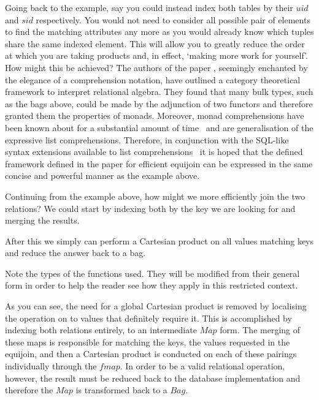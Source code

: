 Going back to the example, say you could instead index both tables by their
$uid$ and $sid$ respectively. You would not need to consider all possible pair
of elements to find the matching attributes any more as you would already know which
tuples share the same indexed element. This will allow you to greatly reduce the
order at which you are taking products and, in effect, `making more work for
yourself'. How might this be achieved? The authors of the paper \relalg{},
seemingly enchanted by the elegance of a comprehension notation, have outlined a
category theoretical framework to interpret relational algebra. They found that
many bulk types, such as the bags above, could be made by the adjunction of two
functors and therefore granted them the properties of monads. Moreover, monad
comprehensions have been known about for a substantial amount of
time~\cite{MonadComprehensions} and are generalisation of the expressive list
comprehensions. Therefore, in conjunction with the SQL-like syntax extensions
available to list comprehensions~\cite{ComprehensiveComprehensions} it is hoped
that the defined framework defined in the paper for efficient equijoin can be
expressed in the same concise and powerful manner as the example above.

Continuing from the example above, how might we more efficiently join the
two relations? We could start by indexing both by the key we are looking for and
merging the results.

\begin{center}

\end{center}

\noindent
After this we simply can perform a Cartesian product on all values matching keys
and reduce the answer back to a bag.

\begin{center}

\end{center}

\noindent
Note the types of the functions used. They will be modified from their general
form in order to help the reader see how they apply in this restricted context.



\noindent
As you can see, the need for a global Cartesian product is removed by localising
the operation on to values that definitely require it. This is accomplished by
indexing both relations entirely, to an intermediate $Map$ form. The merging of
these maps is responsible for matching the keys, the values requested in the
equijoin, and then a Cartesian product is conducted on each of these pairings
individually through the $fmap$. In order to be a valid relational operation,
however, the result must be reduced back to the database implementation and
therefore the $Map$ is transformed back to a $Bag$.

